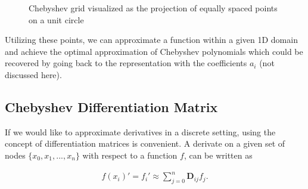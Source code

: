 \begin{figure}[h]
  \centering


  \caption{Chebyshev grid visualized as the projection of equally spaced
    points on a unit circle}
  \label{fig:cheb_grid1d}
\end{figure}

Utilizing these points, we can approximate a function within a given 1D domain
and achieve the optimal approximation of Chebyshev polynomials which could be
recovered by going back to the representation with the coefficients $a_i$ (not
discussed here).

\subsection{Chebyshev Differentiation Matrix}

If we would like to approximate derivatives in a discrete setting, using the
concept of differentiation matrices is convenient. A derivate on a given set of
nodes $\{x_0, x_1,..., x_n\}$ with respect to a function $f$, can be written as

\begin{align}
f(x_i)' = f_i' \approx \sum_{j=0}^{n}\mathbf{D}_{ij}f_j.
\end{align}

